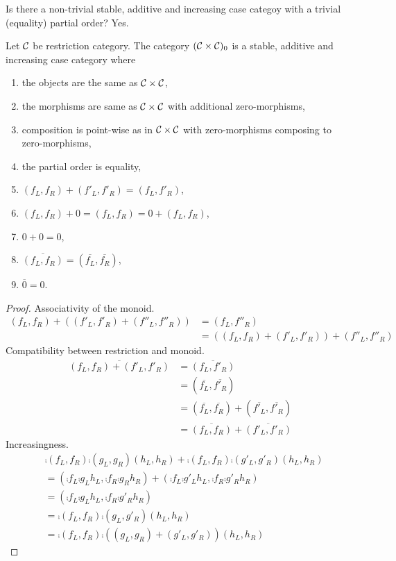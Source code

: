 \documentclass[runningheads,envcountsame]{llncs}
\begin{document}
Is there a non-trivial stable, additive and increasing case categoy with a trivial (equality) partial order? Yes.
\begin{lemma}
    Let $\mathcal{C}$ be restriction category. The category $(\mathcal{C} \times \mathcal{C})_0$ is a stable, additive and increasing case category where
    \begin{enumerate}
        \item the objects are the same as $\mathcal{C} \times \mathcal{C}$,
        \item the morphisms are same as $\mathcal{C} \times \mathcal{C}$ with additional zero-morphisms, 
        \item composition is point-wise as in $\mathcal{C} \times \mathcal{C}$ with zero-morphisms composing to zero-morphisms, 
        \item the partial order is equality,
        \item $(f_L, f_R) + (f'_L, f'_R) = (f_L, f'_R)$,
        \item $(f_L, f_R) + 0 = (f_L, f_R) = 0 + (f_L, f_R)$,
        \item $0 + 0 = 0$,
        \item $\overline{(f_L, f_R)} = (\overline{f_L}, \overline{f_R})$,
        \item $\overline{0} = 0$.
    \end{enumerate}
\end{lemma}
\begin{proof}
    Associativity of the monoid.
    \begin{align}
        (f_L, f_R) + ((f'_L, f'_R) + (f''_L, f''_R)) &= (f_L, f''_R) \\
            &= ((f_L, f_R) + (f'_L, f'_R)) + (f''_L, f''_R)
    \end{align}
    Compatibility between restriction and monoid.
    \begin{align}
        \overline{(f_L, f_R) + (f'_L, f'_R)} &= \overline{(f_L, f'_R)} \\
            &= (\overline{f_L}, \overline{f'_R}) \\
            &= (\overline{f_L}, \overline{f_R}) + (\overline{f'_L}, \overline{f'_R}) \\
            &= \overline{(f_L, f_R)} + \overline{(f'_L, f'_R)}
    \end{align}
    Increasingness.
    \begin{align}
            &\comp{(f_L, f_R)}{\comp{(g_L, g_R)}{(h_L, h_R)}} + \comp{(f_L, f_R)}{\comp{(g'_L, g'_R)}{(h_L, h_R)}} \\
            &= (\comp{f_L}{\comp{g_L}{h_L}}, \comp{f_R}{\comp{g_R}{h_R}}) + (\comp{f_L}{\comp{g'_L}{h_L}}, \comp{f_R}{\comp{g'_R}{h_R}}) \\
            &= (\comp{f_L}{\comp{g_L}{h_L}}, \comp{f_R}{\comp{g'_R}{h_R}}) \\
            &= \comp{(f_L, f_R)}{\comp{(g_L, g'_R)}{(h_L, h_R)}} \\
            &= \comp{(f_L, f_R)}{\comp{((g_L, g_R) + (g'_L, g'_R))}{(h_L, h_R)}}
    \end{align}
\end{proof}
\end{document}
